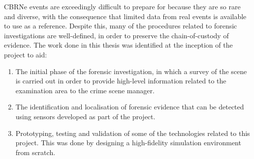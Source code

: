 CBRNe events are exceedingly difficult to prepare for because they are so rare and diverse, with the consequence that limited data from real events is available to use as a reference. Despite this, many of the procedures related to forensic investigations are well-defined, in order to preserve the chain-of-custody of evidence. The work done in this thesis was identified at the inception of the project to aid: 
\begin{enumerate}
    \item The initial phase of the forensic investigation, in which a survey of the scene is carried out in order to provide high-level information related to the examination area to the crime scene manager.
    \item The identification and localisation of forensic evidence that can be detected using sensors developed as part of the project.
    \item Prototyping, testing and validation of some of the technologies related to this project. This was done by designing a high-fidelity simulation environment from scratch.
\end{enumerate}



